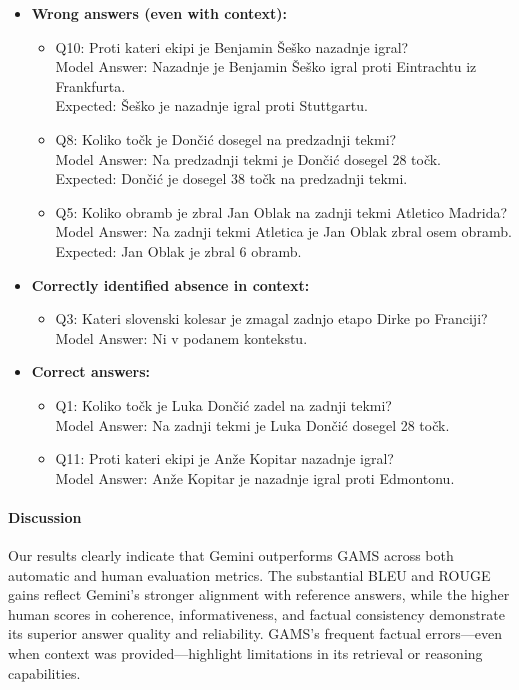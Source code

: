 \documentclass[fleqn,moreauthors,10pt]{ds_report}
\begin{document}
\begin{itemize}
  \item \textbf{Wrong answers (even with context):}
    \begin{itemize}
      \item Q10: Proti kateri ekipi je Benjamin Šeško nazadnje igral? \\
            Model Answer: Nazadnje je Benjamin Šeško igral proti Eintrachtu iz Frankfurta. \\
            Expected: Šeško je nazadnje igral proti Stuttgartu.
      \item Q8: Koliko točk je Dončić dosegel na predzadnji tekmi? \\
            Model Answer: Na predzadnji tekmi je Dončić dosegel 28 točk. \\
            Expected: Dončić je dosegel 38 točk na predzadnji tekmi.
      \item Q5: Koliko obramb je zbral Jan Oblak na zadnji tekmi Atletico Madrida? \\
            Model Answer: Na zadnji tekmi Atletica je Jan Oblak zbral osem obramb. \\
            Expected: Jan Oblak je zbral 6 obramb.
    \end{itemize}
  \item \textbf{Correctly identified absence in context:}
    \begin{itemize}
      \item Q3: Kateri slovenski kolesar je zmagal zadnjo etapo Dirke po Franciji? \\
            Model Answer: Ni v podanem kontekstu.
    \end{itemize}
  \item \textbf{Correct answers:}
    \begin{itemize}
      \item Q1: Koliko točk je Luka Dončić zadel na zadnji tekmi? \\
            Model Answer: Na zadnji tekmi je Luka Dončić dosegel 28 točk.
      \item Q11: Proti kateri ekipi je Anže Kopitar nazadnje igral? \\
            Model Answer: Anže Kopitar je nazadnje igral proti Edmontonu.
    \end{itemize}
\end{itemize}

\paragraph{Discussion}
Our results clearly indicate that Gemini outperforms GAMS across both automatic and human evaluation metrics. The substantial BLEU and ROUGE gains reflect Gemini’s stronger alignment with reference answers, while the higher human scores in coherence, informativeness, and factual consistency demonstrate its superior answer quality and reliability. GAMS’s frequent factual errors—even when context was provided—highlight limitations in its retrieval or reasoning capabilities.
\end{document}
